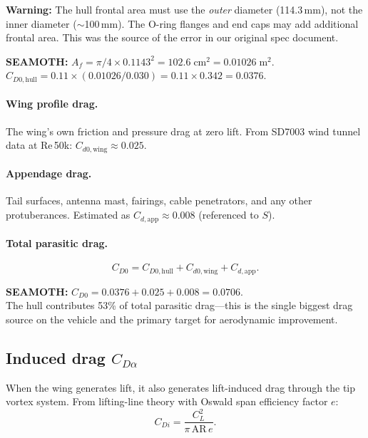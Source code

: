 \documentclass[11pt,a4paper]{article}
\newcommand{\note}[1]{\par\smallskip\noindent\colorbox{blue!8}{\parbox{\dimexpr\linewidth-2\fboxsep}{%
  \small\textbf{SEAMOTH:} #1}}\smallskip}
\newcommand{\warning}[1]{\par\smallskip\noindent\colorbox{red!8}{\parbox{\dimexpr\linewidth-2\fboxsep}{%
  \small\textbf{Warning:} #1}}\smallskip}
\begin{document}
\warning{The hull frontal area must use the \emph{outer} diameter (114.3\,mm), not the
inner diameter ($\sim$100\,mm).  The O-ring flanges and end caps may add additional
frontal area.  This was the source of the error in our original spec document.}

\note{$A_f = \pi/4 \times 0.1143^2 = 102.6\;\mathrm{cm}^2 = 0.01026\;\mathrm{m}^2$.\\
$C_{D0,\text{hull}} = 0.11 \times (0.01026/0.030) = 0.11 \times 0.342 = \mathbf{0.0376}$.}

\paragraph{Wing profile drag.}
The wing's own friction and pressure drag at zero lift.  From SD7003 wind tunnel data
at Re\,50k: $C_{d0,\text{wing}} \approx 0.025$.

\paragraph{Appendage drag.}
Tail surfaces, antenna mast, fairings, cable penetrators, and any other protuberances.
Estimated as $C_{d,\text{app}} \approx 0.008$ (referenced to $S$).

\paragraph{Total parasitic drag.}
\begin{equation}
  C_{D0} = C_{D0,\text{hull}} + C_{d0,\text{wing}} + C_{d,\text{app}}.
  \label{eq:CD0total}
\end{equation}

\note{$C_{D0} = 0.0376 + 0.025 + 0.008 = \mathbf{0.0706}$.\\
The hull contributes 53\% of total parasitic drag---this is the single biggest drag source
on the vehicle and the primary target for aerodynamic improvement.}

\subsection{Induced drag $C_{D\alpha}$}

When the wing generates lift, it also generates lift-induced drag through the tip
vortex system.  From lifting-line theory with Oswald span efficiency factor $e$:
\begin{equation}
  C_{Di} = \frac{C_L^2}{\pi\,\mathrm{AR}\,e}.
  \label{eq:CDi}
\end{equation}
\end{document}
